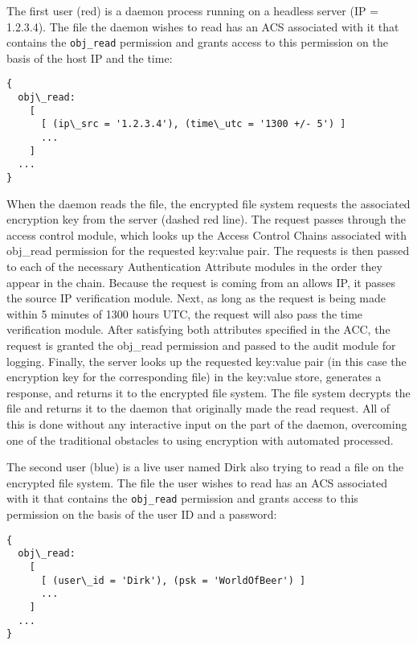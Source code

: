 The first user (red) is a daemon process running on a headless server
(IP = 1.2.3.4). The file the daemon wishes to read has an ACS
associated with it that contains the \texttt{obj\_read} permission and
grants access to this permission on the basis of the host IP and the
time:

\begin{Verbatim}[samepage=true]
{
  obj\_read:
    [
      [ (ip\_src = '1.2.3.4'), (time\_utc = '1300 +/- 5') ]
      ...
    ]
  ...
}
\end{Verbatim}

When the daemon reads the file, the encrypted file system requests the
associated encryption key from the server (dashed red line). The
request passes through the access control module, which looks up the
Access Control Chains associated with obj\_read permission for the
requested key:value pair. The requests is then passed to each of the
necessary Authentication Attribute modules in the order they appear in
the chain. Because the request is coming from an allows IP, it passes
the source IP verification module. Next, as long as the request is
being made within 5 minutes of 1300 hours UTC, the request will also
pass the time verification module. After satisfying both attributes
specified in the ACC, the request is granted the obj\_read permission
and passed to the audit module for logging. Finally, the server looks
up the requested key:value pair (in this case the encryption key for
the corresponding file) in the key:value store, generates a response,
and returns it to the encrypted file system. The file system decrypts
the file and returns it to the daemon that originally made the read
request. All of this is done without any interactive input on the part
of the daemon, overcoming one of the traditional obstacles to using
encryption with automated processed.

The second user (blue) is a live user named Dirk also trying to read a
file on the encrypted file system. The file the user wishes to read
has an ACS associated with it that contains the \texttt{obj\_read}
permission and grants access to this permission on the basis of the
user ID and a password:

\begin{verbatim}
{
  obj\_read:
    [
      [ (user\_id = 'Dirk'), (psk = 'WorldOfBeer') ]
      ...
    ]
  ...
}
\end{verbatim}

